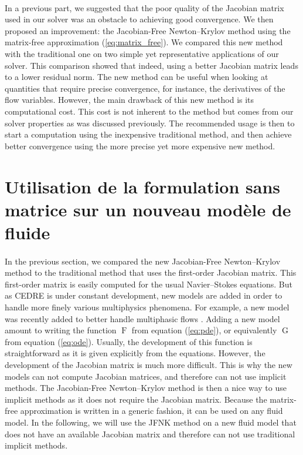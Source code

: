     \paragraph{}
    In a previous part, we suggested that the poor quality of the Jacobian matrix used in our solver was an obstacle to achieving good convergence.
    We then proposed an improvement: the Jacobian-Free Newton--Krylov method using the matrix-free approximation (\ref{eq:matrix_free}).
    We compared this new method with the traditional one on two simple yet representative applications of our solver.
    This comparison showed that indeed, using a better Jacobian matrix leads to a lower residual norm.
    The new method can be useful when looking at quantities that require precise convergence, for instance, the derivatives of the flow variables.
    However, the main drawback of this new method is its computational cost.
    This cost is not inherent to the method but comes from our solver properties as was discussed previously.
    The recommended usage is then to start a computation using the inexpensive traditional method, and then achieve better convergence using the more precise yet more expensive new method.


  \section{Utilisation de la formulation sans matrice sur un nouveau modèle de fluide}

    \paragraph{}
    In the previous section, we compared the new Jacobian-Free Newton--Krylov method to the traditional method that uses the first-order Jacobian matrix.
    This first-order matrix is easily computed for the usual Navier--Stokes equations.
    But as CEDRE is under constant development, new models are added in order to handle more finely various multiphysics phenomena.
    For example, a new model was recently added to better handle multiphasic flows \cite{Cordesse2020}.
    Adding a new model amount to writing the function $\operatorname{F}$ from equation (\ref{eq:pde}), or equivalently $\operatorname{G}$ from equation (\ref{eq:ode}).
    Usually, the development of this function is straightforward as it is given explicitly from the equations.
    However, the development of the Jacobian matrix is much more difficult.
    This is why the new models can not compute Jacobian matrices, and therefore can not use implicit methods.
    The Jacobian-Free Newton--Krylov method is then a nice way to use implicit methods as it does not require the Jacobian matrix.
    Because the matrix-free approximation is written in a generic fashion, it can be used on any fluid model.
    In the following, we will use the JFNK method on a new fluid model that does not have an available Jacobian matrix and therefore can not use traditional implicit methods.


